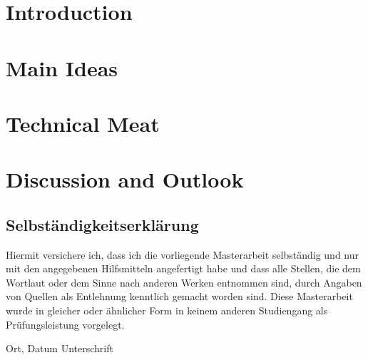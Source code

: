 \documentclass[twoside,12pt,a4paper]{report}
\begin{document}
\chapter{Introduction}
\label{chap:introduction}


\chapter{Main Ideas}
\label{chap:mainideas}


\chapter{Technical Meat}
\label{chap:technical-meat}


\chapter{Discussion and Outlook}
\label{chap:discussion}


\printbibliography[heading=bibintoc]

\cleardoublepage
\thispagestyle{empty}
\section*{Selbständigkeitserklärung}

Hiermit versichere ich, dass ich die vorliegende Masterarbeit 
selbständig und nur mit den angegebenen Hilfsmitteln angefertigt habe und dass alle Stellen, die dem Wortlaut oder dem 
Sinne nach anderen Werken entnommen sind, durch Angaben von Quellen als 
Entlehnung kenntlich gemacht worden sind. 
Diese Masterarbeit wurde in gleicher oder ähnlicher Form in keinem anderen 
Studiengang als Prüfungsleistung vorgelegt. 

\vskip 3cm

Ort, Datum	\hfill Unterschrift \hfill 
\end{document}
